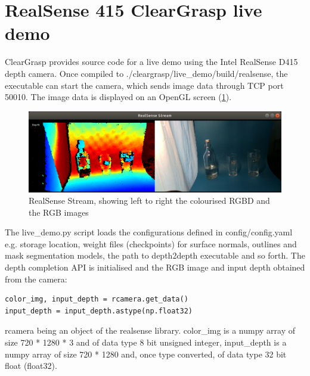 \section{RealSense 415 ClearGrasp live demo}
ClearGrasp provides source code for a live demo using the Intel RealSense D415 depth camera. Once compiled to ./cleargrasp/live\_demo/build/realsense, the executable can start the camera, which sends image data through TCP port 50010. The image data is displayed on an OpenGL screen (\ref{fig:realsenseOutputForReport}).
\begin{figure}[h!]
\centering
\includegraphics[width=\textwidth]{Figures/realsenseOutputForReport.png}
\caption{RealSense Stream, showing left to right the colourised RGBD and the RGB images}
\label{fig:realsenseOutputForReport}
\end{figure}
The live\_demo.py script loads the configurations defined in config/config.yaml e.g. storage location, weight files (checkpoints) for surface normals, outlines and mask segmentation models, the path to depth2depth executable and so forth. The depth completion API is initialised and the RGB image and input depth obtained from the camera:
\begin{verbatim}
color_img, input_depth = rcamera.get_data()
input_depth = input_depth.astype(np.float32)
\end{verbatim}
rcamera being an object of the realsense library. color\_img is a numpy array of size 720 * 1280 * 3 and of data type 8 bit unsigned integer, input\_depth is a numpy array of size 720 * 1280 and, once type converted, of data type 32 bit float (float32).
